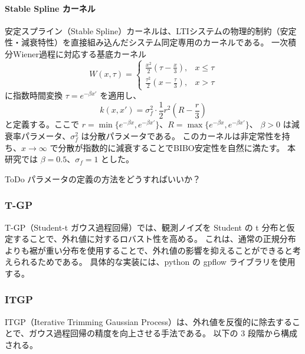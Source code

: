 \paragraph{Stable Spline カーネル}
安定スプライン（Stable Spline）カーネルは、LTIシステムの物理的制約（安定性・減衰特性）を直接組み込んだシステム同定専用のカーネルである\cite{PILLONETTO201081}。
一次積分Wiener過程に対応する基底カーネル
\begin{equation}
W(x,\tau) = \begin{cases}
\frac{x^2}{2}\left(\tau-\frac{x}{3}\right), & x \leq \tau \\
\frac{\tau^2}{2}\left(x-\frac{\tau}{3}\right), & x > \tau
\end{cases}
\end{equation}
に指数時間変換 $\tau = e^{-\beta x'}$ を適用し、
\begin{equation}
k(x,x') = \sigma_f^2 \cdot \frac{1}{2}r^2\left(R - \frac{r}{3}\right)
\end{equation}
と定義する。ここで $r = \min\{e^{-\beta x}, e^{-\beta x'}\}$、$R = \max\{e^{-\beta x}, e^{-\beta x'}\}$、
$\beta > 0$ は減衰率パラメータ、$\sigma_f^2$ は分散パラメータである。
このカーネルは非定常性を持ち、$x \to \infty$ で分散が指数的に減衰することでBIBO安定性を自然に満たす。
本研究では $\beta = 0.5$、$\sigma_f = 1$ とした。

ToDo パラメータの定義の方法をどうすればいいか？


\subsubsection{T-GP}
\label{sec:t_gp}
T-GP（Student-t ガウス過程回帰）では、観測ノイズを Student の t 分布と仮定することで、外れ値に対するロバスト性を高める。\cite{jylanki2011}
これは、通常の正規分布よりも裾が重い分布を使用することで、外れ値の影響を抑えることができると考えられるためである。
具体的な実装には、python の gpflow ライブラリを使用する。

\subsubsection{ITGP}
\label{sec:itgp}
ITGP（Iterative Trimming Gaussian Process）は、外れ値を反復的に除去することで、ガウス過程回帰の精度を向上させる手法である。\cite{Li2021}
以下の 3 段階から構成される。

